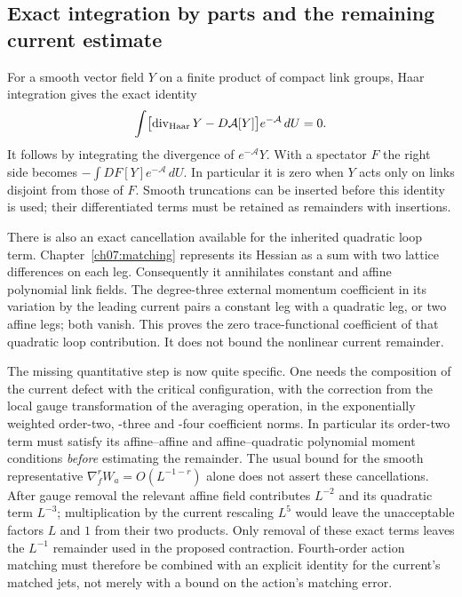 \subsection{Exact integration by parts and the remaining current estimate}

For a smooth vector field $Y$ on a finite product of compact link groups,
Haar integration gives the exact identity
\begin{equation}
 \int\bigl[\operatorname{div}_{\rm Haar}Y
                  -D\mathcal A[Y]\bigr]e^{-\mathcal A}\,dU=0.
 \label{ch17:finite-haar}
\end{equation}
It follows by integrating the divergence of $e^{-\mathcal A}Y$.
With a spectator $F$ the right side becomes
$-\int DF[Y]e^{-\mathcal A}\,dU$. In particular it is zero when
$Y$ acts only on links disjoint from those of $F$. Smooth truncations
can be inserted before this identity is used; their differentiated terms
must be retained as remainders with insertions.

There is also an exact cancellation available for the inherited quadratic
loop term. Chapter~\ref{ch07:matching} represents its Hessian as a sum
with two lattice differences on each leg. Consequently it annihilates
constant and affine polynomial link fields. The degree-three external
momentum coefficient in its variation by the leading current pairs a
constant leg with a quadratic leg, or two affine legs; both vanish.
This proves the zero trace-functional coefficient of that quadratic
loop contribution. It does not bound the nonlinear current remainder.

The missing quantitative step is now quite specific. One needs the
composition of the current defect with the critical configuration, with the correction from the local gauge transformation of the
averaging operation, in the exponentially weighted order-two, -three and
-four coefficient norms. In particular its order-two term must
satisfy its affine--affine and affine--quadratic polynomial moment conditions
\emph{before} estimating the remainder. The usual bound for the smooth representative
$\nabla_f^rW_a=O(L^{-1-r})$ alone does not assert these cancellations.
After gauge removal the relevant affine field contributes $L^{-2}$ and its
quadratic term $L^{-3}$; multiplication by the current rescaling $L^5$
would leave the unacceptable factors $L$ and $1$ from their two products.
Only removal of these exact terms leaves the $L^{-1}$ remainder used
in the proposed contraction. Fourth-order action matching must therefore
be combined with an explicit identity for the current's matched jets,
not merely with a bound on the action's matching error.

